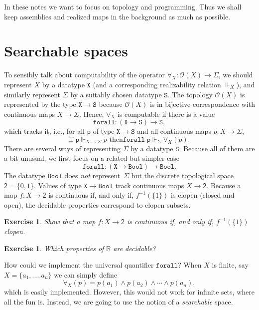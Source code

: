 \documentclass[a4paper,10pt]{article}
\newtheorem{exercise}[theorem]{Exercise}
\newcommand{\RR}{\mathbb{R}}
\newcommand{\set}[1]{\{#1\}}
\newcommand{\tpl}[1]{\mathcal{O}(#1)}
\newcommand{\two}{\mathsf{2}}
\newcommand{\Bool}{\mathtt{Bool}}
\newcommand{\R}[1]{\mathtt{#1}}
\newcommand{\rz}{\Vdash}
\begin{document}
In these notes we want to focus on topology and programming. Thus we shall
keep assemblies and realized maps in the background as much as possible.


\section{Searchable spaces}
\label{sec:searchable-spaces}

To sensibly talk about computability of the operator $\forall_X : \tpl{X} \to
\Sigma$, we should represent $X$ by a datatype $\mathtt{X}$ (and a
corresponding realizability relation $\rz_X$), and similarly represent
$\Sigma$ by a suitably chosen datatype $\mathtt{S}$. The topology $\tpl{X}$ is
represented by the type $\mathtt{X} \to \mathtt{S}$ because $\tpl{X}$ is in
bijective correspondence with continuous maps $X \to \Sigma$. Hence,
$\forall_X$ is computable if there is a value
% 
\begin{equation*} \R{forall} : (\mathtt{X} \to \mathtt{S}) \to \mathtt{S},
\end{equation*}
% 
which tracks it, i.e., for all $\R{p}$ of type $\mathtt{X} \to \mathtt{S}$ and
all continuous maps $p : X \to \Sigma$,
% 
\begin{equation*} \text{if $\R{p} \rz_{X \to \Sigma} p$ then
$\R{forall}\;\R{p} \rz_\Sigma \forall_X(p)$.}
\end{equation*}
% 
There are several ways of representing $\Sigma$ by a datatype $\mathtt{S}$.
Because all of them are a bit unusual, we first focus on a related but simpler
case
% 
\begin{equation}
  \label{eq:forall-bool} \mathtt{forall} : (\mathtt{X} \to \Bool) \to \Bool.
\end{equation}
% 
The datatype $\Bool$ does \emph{not} represent~$\Sigma$ but the discrete
topological space $\two = \set{0, 1}$. Values of type $\mathtt{X} \to \Bool$
track continuous maps $X \to \two$. Because a map $f : X \to \two$ is
continuous if, and only if, $f^{-1}(\set{1})$ is clopen (closed and open), the
decidable properties correspond to clopen subsets.

\begin{exercise} Show that a map $f : X \to \two$ is continuous if, and only
if, $f^{-1}(\set{1})$ clopen.
\end{exercise}

\begin{exercise} Which properties of $\RR$ are decidable?
\end{exercise}
% 
How could we implement the universal quantifier $\mathtt{forall}$? When $X$ is
finite, say $X = \set{a_1, \ldots, a_n}$ we can simply define
% 
\begin{equation*} \forall_X(p) = p(a_1) \land p(a_2) \land \cdots \land
p(a_n),
\end{equation*}
% 
which is easily implemented.
% 
However, this would not work for infinite sets, where all the fun is. Instead,
we are going to use the notion of a \emph{searchable} space.
\end{document}
